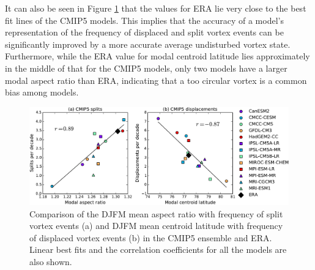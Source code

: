It can also be seen in Figure \ref{fig:cmip5_moments_scatter} that the values for
ERA lie very close to the best fit lines of the CMIP5 models. This implies that
the accuracy of a model's representation of the frequency of displaced and split
vortex events can be significantly improved by a more accurate average
undisturbed vortex state. Furthermore, while the ERA value for modal centroid
latitude lies approximately in the middle of that for the CMIP5 models, only two
models have a larger modal aspect ratio than ERA, indicating that a too circular
vortex is a common bias among models. 

\begin{figure}
 \centering
 \noindent\includegraphics[width=\textwidth]{figures/chapter-models/CMIP5_moments_scatter.pdf}
 \caption[Comparison of moment diagnostics and frequency of split and displaced
 vortex events.]{Comparison of the DJFM mean aspect ratio with frequency of
   split vortex events (a) and DJFM mean centroid latitude with frequency of
   displaced vortex events (b) in the CMIP5 ensemble and ERA. Linear best fits
   and the correlation coefficients for all the models are also shown.}
 \label{fig:cmip5_moments_scatter}
\end{figure}


